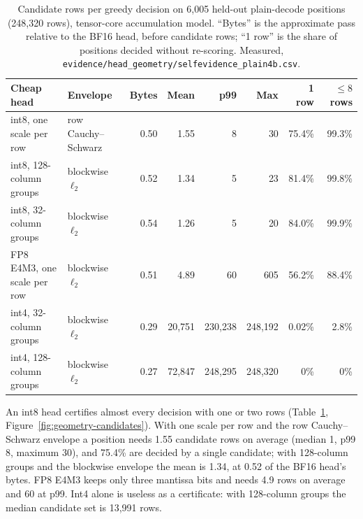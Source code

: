 \begin{table}[tbp]
\small\centering
\begin{tabular}{@{}llrrrrrr@{}}\toprule
Cheap head & Envelope & Bytes & Mean & p99 & Max & 1 row & $\le8$ rows\\\midrule
int8, one scale per row & row Cauchy--Schwarz & 0.50 & 1.55 & 8 & 30 & 75.4\% & 99.3\%\\
int8, 128-column groups & blockwise $\ell_2$ & 0.52 & 1.34 & 5 & 23 & 81.4\% & 99.8\%\\
int8, 32-column groups & blockwise $\ell_2$ & 0.54 & 1.26 & 5 & 20 & 84.0\% & 99.9\%\\
FP8 E4M3, one scale per row & blockwise $\ell_2$ & 0.51 & 4.89 & 60 & 605 & 56.2\% & 88.4\%\\
int4, 32-column groups & blockwise $\ell_2$ & 0.29 & 20,751 & 230,238 & 248,192 & 0.02\% & 2.8\%\\
int4, 128-column groups & blockwise $\ell_2$ & 0.27 & 72,847 & 248,295 & 248,320 & 0\% & 0\%\\\bottomrule
\end{tabular}
\caption{Candidate rows per greedy decision on 6,005 held-out plain-decode positions (248,320 rows), tensor-core accumulation model. ``Bytes'' is the approximate pass relative to the BF16 head, before candidate rows; ``1 row'' is the share of positions decided without re-scoring. Measured, \nolinkurl{evidence/head_geometry/selfevidence_plain4b.csv}.}
\label{tab:geometry-candidates}
\end{table}

An int8 head certifies almost every decision with one or two rows (Table~\ref{tab:geometry-candidates}, Figure~\ref{fig:geometry-candidates}). With one scale per row and the row Cauchy--Schwarz envelope a position needs 1.55 candidate rows on average (median 1, p99 8, maximum 30), and 75.4\% are decided by a single candidate; with 128-column groups and the blockwise envelope the mean is 1.34, at 0.52 of the BF16 head's bytes. FP8 E4M3 keeps only three mantissa bits and needs 4.9 rows on average and 60 at p99. Int4 alone is useless as a certificate: with 128-column groups the median candidate set is 13,991 rows.

